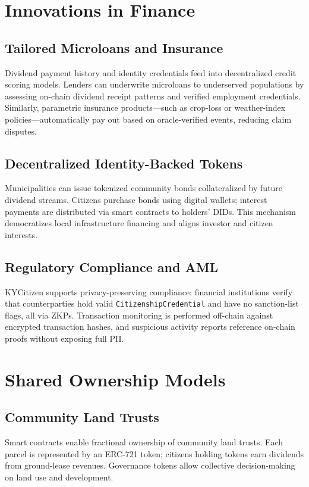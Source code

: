 \documentclass[11pt]{article}
\begin{document}
\section{Innovations in Finance}
\subsection{Tailored Microloans and Insurance}
Dividend payment history and identity credentials feed into decentralized credit scoring models. Lenders can underwrite microloans to underserved populations by assessing on-chain dividend receipt patterns and verified employment credentials. Similarly, parametric insurance products—such as crop-loss or weather-index policies—automatically pay out based on oracle-verified events, reducing claim disputes.

\subsection{Decentralized Identity-Backed Tokens}
Municipalities can issue tokenized community bonds collateralized by future dividend streams. Citizens purchase bonds using digital wallets; interest payments are distributed via smart contracts to holders’ DIDs. This mechanism democratizes local infrastructure financing and aligns investor and citizen interests.

\subsection{Regulatory Compliance and AML}
KYCitizen supports privacy-preserving compliance: financial institutions verify that counterparties hold valid \texttt{CitizenshipCredential} and have no sanction-list flags, all via ZKPs. Transaction monitoring is performed off-chain against encrypted transaction hashes, and suspicious activity reports reference on-chain proofs without exposing full PII.

\section{Shared Ownership Models}
\subsection{Community Land Trusts}
Smart contracts enable fractional ownership of community land trusts. Each parcel is represented by an ERC-721 token; citizens holding tokens earn dividends from ground-lease revenues. Governance tokens allow collective decision-making on land use and development.
\end{document}
